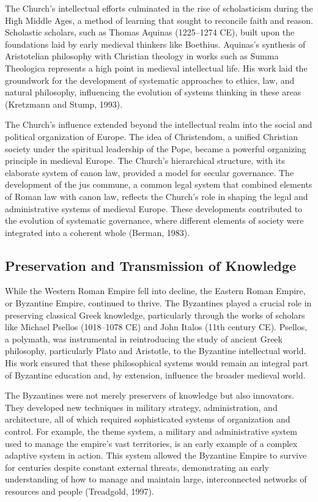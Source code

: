 \documentclass[twocolumn]{article}
\begin{document}
\textcolor{secondary}{The Church’s intellectual efforts culminated in the rise of scholasticism during the High Middle Ages, a method of learning that sought to reconcile faith and reason. Scholastic scholars, such as Thomas Aquinas (1225–1274 CE), built upon the foundations laid by early medieval thinkers like Boethius. Aquinas’s synthesis of Aristotelian philosophy with Christian theology in works such as Summa Theologica represents a high point in medieval intellectual life. His work laid the groundwork for the development of systematic approaches to ethics, law, and natural philosophy, influencing the evolution of systems thinking in these areas (Kretzmann and Stump, 1993).}

\textcolor{primary}{The Church’s influence extended beyond the intellectual realm into the social and political organization of Europe. The idea of Christendom, a unified Christian society under the spiritual leadership of the Pope, became a powerful organizing principle in medieval Europe. The Church’s hierarchical structure, with its elaborate system of canon law, provided a model for secular governance. The development of the jus commune, a common legal system that combined elements of Roman law with canon law, reflects the Church’s role in shaping the legal and administrative systems of medieval Europe. These developments contributed to the evolution of systematic governance, where different elements of society were integrated into a coherent whole (Berman, 1983).}

\subsection{Preservation and Transmission of Knowledge}

\textcolor{primary}{While the Western Roman Empire fell into decline, the Eastern Roman Empire, or Byzantine Empire, continued to thrive. The Byzantines played a crucial role in preserving classical Greek knowledge, particularly through the works of scholars like Michael Psellos (1018–1078 CE) and John Italos (11th century CE). Psellos, a polymath, was instrumental in reintroducing the study of ancient Greek philosophy, particularly Plato and Aristotle, to the Byzantine intellectual world. His work ensured that these philosophical systems would remain an integral part of Byzantine education and, by extension, influence the broader medieval world.}

\textcolor{secondary}{The Byzantines were not merely preservers of knowledge but also innovators. They developed new techniques in military strategy, administration, and architecture, all of which required sophisticated systems of organization and control. For example, the theme system, a military and administrative system used to manage the empire's vast territories, is an early example of a complex adaptive system in action. This system allowed the Byzantine Empire to survive for centuries despite constant external threats, demonstrating an early understanding of how to manage and maintain large, interconnected networks of resources and people (Treadgold, 1997).}
\end{document}
